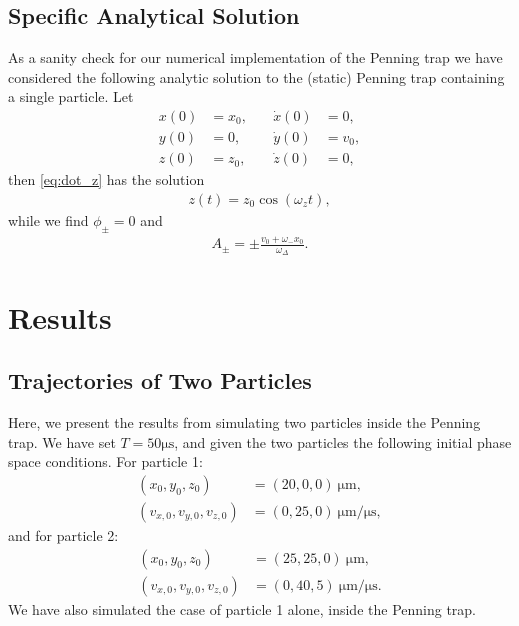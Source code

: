 \documentclass[english,notitlepage,reprint]{revtex4-2}  %
\begin{document}
\subsection{Specific Analytical Solution}
As a sanity check for our numerical implementation of the Penning trap we have considered the following analytic solution to the (static) Penning trap containing a single particle. Let 
\begin{subequations}
\begin{alignat}{2}
    x(0) &= x_0, &\quad  \dot{x}(0) &= 0, \\
    y(0) &= 0,   &\quad  \dot{y}(0) &= v_0, \\ 
    z(0) &= z_0, &\quad  \dot{z}(0) &= 0,
\end{alignat}
\end{subequations}
then \eqref{eq:dot_z} has the solution 
\begin{align}
    z(t) = z_0\cos(\omega_z t), \label{eq:z_analytic}
\end{align}
while we find \(\phi_{\pm} = 0\) and 
\begin{align}
    A_{\pm} = \pm \frac{v_0 + \omega_-x_0}{\omega_{\Delta}}.
\end{align}

\section{Results}
\subsection{Trajectories of Two Particles}
Here, we present the results from simulating two particles inside the Penning trap. We have set \(T=50\si{\us}\), and given the two particles the following initial phase space conditions. For particle 1:
\begin{subequations}
    \begin{align}
        (x_0, y_0, z_0) &= (20,0,0) \ \si{\um}, \\ 
        (v_{x,0}, v_{y,0}, v_{z,0}) &= (0,25,0)\ \si{\um/\us},
    \end{align}
\end{subequations}
and for particle 2:
\begin{subequations}
    \begin{align}
        (x_0, y_0, z_0) &= (25,25,0)\ \si{\um}, \\ 
        (v_{x,0}, v_{y,0}, v_{z,0}) &= (0,40,5)\ \si{\um/\us}.
    \end{align}
\end{subequations}
We have also simulated the case of particle 1 alone, inside the Penning trap.
\end{document}
